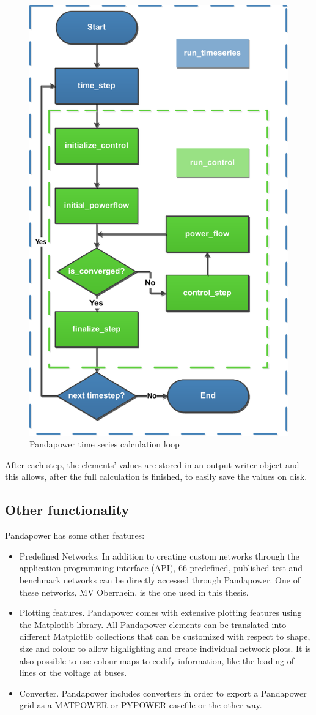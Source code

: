 \begin{figure}[H]
\centering
    \includegraphics[width=.4\linewidth]{images/Background/Pandapower/run_timeseries_loop.pdf}
\caption{Pandapower time series calculation loop \cite{pandapowerts}}
\end{figure}

After each step, the elements' values are stored in an output writer object and this allows, after the full calculation is finished, to easily save the values on disk.

\subsection{Other functionality}
Pandapower has some other features:
\begin{itemize}
    \item Predefined Networks. In addition to creating custom networks through the application programming interface (\gls{API}), 66 predefined, published test and benchmark networks can be directly accessed through Pandapower. One of these networks, MV Oberrhein, is the one used in this thesis.
    \item Plotting features. Pandapower comes with extensive plotting features using the Matplotlib library. All Pandapower elements can be translated into different Matplotlib collections that can be customized with respect to shape, size and colour to allow highlighting and create individual network plots. It is also possible to use colour maps to codify information, like the loading of lines or the voltage at buses.
    \item Converter. Pandapower includes converters in order to export a Pandapower grid as a MATPOWER or PYPOWER casefile or the other way.
\end{itemize}